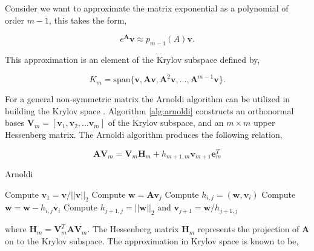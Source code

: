 Consider we want to approximate the matrix exponential as a polynomial of order $m-1$, this takes the form,

\begin{equation}
    e^{\boldsymbol{A}}\boldsymbol{v} \approx p_{m-1}(A)\boldsymbol{v}.
    \label{eq:expPolynomailForm}
\end{equation}

\noindent This approximation is an element of the Krylov subspace defined by,

\begin{equation}
    K_{m} = \text{span}\{\boldsymbol{v}, \boldsymbol{A}\boldsymbol{v}, \boldsymbol{A}^{2}\boldsymbol{v}, ... ,\boldsymbol{A}^{m-1}\boldsymbol{v}\}.
\end{equation}

\noindent For a general non-symmetric matrix the Arnoldi algorithm can be utilized in building the Krylov space \cite{saad1992} \cite{saad1989}. Algorithm \ref{alg:arnoldi} constructs an orthonormal bases $\boldsymbol{V}_{m} = [\boldsymbol{v}_{1}, \boldsymbol{v}_{2}, ... \boldsymbol{v}_{m}]$ of the Krylov subspace, and an $m \times m$ upper Hessenberg matrix. The Arnoldi algorithm produces the following relation,

\begin{equation}
    \boldsymbol{A}\boldsymbol{V}_{m} = \boldsymbol{V}_{m}\boldsymbol{H}_{m} + h_{m+1,m}\boldsymbol{v}_{m+1}\boldsymbol{e}^{T}_{m}
    \label{eq:arnoldiResult}
\end{equation}

\begin{algorithm}
	\caption{Arnoldi} 
	\begin{algorithmic}[1]
	    \State Compute $\boldsymbol{v}_{1} = \boldsymbol{v}/||\boldsymbol{v}||_{2}$
            \State Compute $\boldsymbol{w} = \boldsymbol{A}\boldsymbol{v}_{j}$
                \State Compute $h_{i,j} = (\boldsymbol{w},\boldsymbol{v}_{i})$
                \State Compute $\boldsymbol{w} = \boldsymbol{w} - h_{i,j}\boldsymbol{v}_{i}$
            \EndFor
            \State Compute $h_{j+1, j} = ||\boldsymbol{w}||_{2}$ and $\boldsymbol{v}_{j+1} = \boldsymbol{w}/h_{j+1,j}$
		\EndFor
	\end{algorithmic} 
	\label{alg:arnoldi}
\end{algorithm}

\noindent where $\boldsymbol{H}_{m} = \boldsymbol{V}^{T}_{m}\boldsymbol{A}\boldsymbol{V}_{m}$. The Hessenberg matrix $\boldsymbol{H}_{m}$ represents the projection of $\boldsymbol{A}$ on to the Krylov subspace. The approximation in Krylov space is known to be, 

